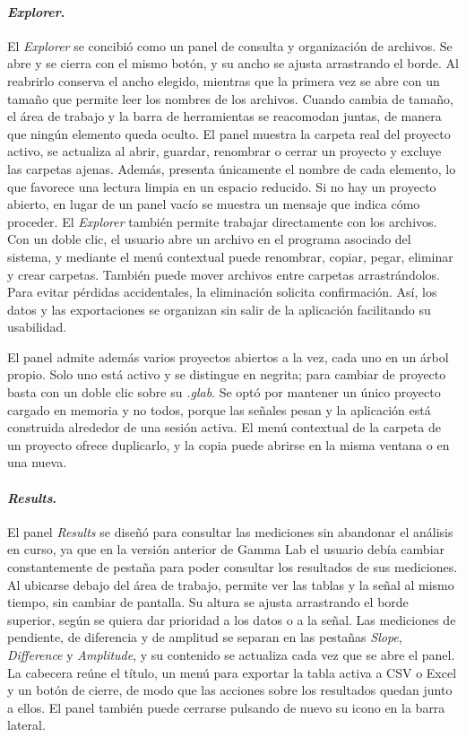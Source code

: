 \documentclass[12pt,letterpaper,oneside]{article}
\begin{document}
\paragraph{\textit{Explorer}.} El \textit{Explorer} se concibió como un panel de consulta y organización de archivos. Se abre y se cierra con el mismo botón, y su ancho se ajusta arrastrando el borde. Al reabrirlo conserva el ancho elegido, mientras que la primera vez se abre con un tamaño que permite leer los nombres de los archivos. Cuando cambia de tamaño, el área de trabajo y la barra de herramientas se reacomodan juntas, de manera que ningún elemento queda oculto. El panel muestra la carpeta real del proyecto activo, se actualiza al abrir, guardar, renombrar o cerrar un proyecto y excluye las carpetas ajenas. Además, presenta únicamente el nombre de cada elemento, lo que favorece una lectura limpia en un espacio reducido. Si no hay un proyecto abierto, en lugar de un panel vacío se muestra un mensaje que indica cómo proceder. El \textit{Explorer} también permite trabajar directamente con los archivos. Con un doble clic, el usuario abre un archivo en el programa asociado del sistema, y mediante el menú contextual puede renombrar, copiar, pegar, eliminar y crear carpetas. También puede mover archivos entre carpetas arrastrándolos. Para evitar pérdidas accidentales, la eliminación solicita confirmación. Así, los datos y las exportaciones se organizan sin salir de la aplicación facilitando su usabilidad.

El panel admite además varios proyectos abiertos a la vez, cada uno en un árbol propio. Solo uno está activo y se distingue en negrita; para cambiar de proyecto basta con un doble clic sobre su \textit{.glab}. Se optó por mantener un único proyecto cargado en memoria y no todos, porque las señales pesan y la aplicación está construida alrededor de una sesión activa. El menú contextual de la carpeta de un proyecto ofrece duplicarlo, y la copia puede abrirse en la misma ventana o en una nueva.

\paragraph{\textit{Results}.} El panel \textit{Results} se diseñó para consultar las mediciones sin abandonar el análisis en curso, ya que en la versión anterior de Gamma Lab el usuario debía cambiar constantemente de pestaña para poder consultar los resultados de sus mediciones. Al ubicarse debajo del área de trabajo, permite ver las tablas y la señal al mismo tiempo, sin cambiar de pantalla. Su altura se ajusta arrastrando el borde superior, según se quiera dar prioridad a los datos o a la señal. Las mediciones de pendiente, de diferencia y de amplitud se separan en las pestañas \textit{Slope}, \textit{Difference} y \textit{Amplitude}, y su contenido se actualiza cada vez que se abre el panel. La cabecera reúne el título, un menú para exportar la tabla activa a CSV o Excel y un botón de cierre, de modo que las acciones sobre los resultados quedan junto a ellos. El panel también puede cerrarse pulsando de nuevo su icono en la barra lateral.
\end{document}
